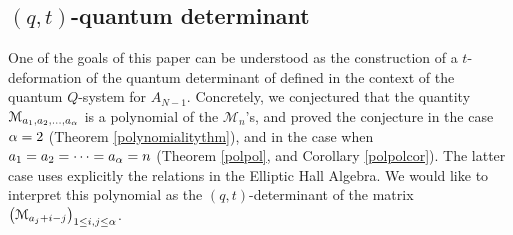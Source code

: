 \subsection{$(q,t)$-quantum determinant}

One of the goals of this paper can be understood as the construction of a $t$-deformation of the quantum determinant
of \cite{DFK15} defined in the context of the quantum $Q$-system for $A_{N-1}$. 
Concretely, we conjectured that the quantity
${\mathcal M}_{a_1,a_2,...,a_{\alpha}}$ 
is a polynomial of the ${\mathcal M}_n$'s, and proved the conjecture in the case ${\alpha}=2$ (Theorem \ref{polynomialitythm}),
and in the case when $a_1=a_2=\cdots =a_{\alpha}=n$ (Theorem \ref{polpol}, and Corollary \ref{polpolcor}). 
The latter case uses explicitly the relations in the Elliptic Hall Algebra.
We would like to interpret this polynomial as the $(q,t)$-determinant of the matrix
$\left( {\mathcal M}_{a_j+i-j}\right)_{1\leq i,j\leq {\alpha}}$.


